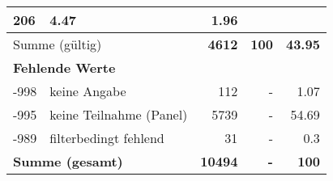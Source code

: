 \begin{longtable}{lXrrr}
       \num{206} &
       \num[round-mode=places,round-precision=2]{4.47} &
         \num[round-mode=places,round-precision=2]{1.96} \\
     \midrule
     \multicolumn{2}{l}{Summe (gültig)} &
       \textbf{\num{4612}} &
     \textbf{\num{100}} &
       \textbf{\num[round-mode=places,round-precision=2]{43.95}} \\
     \multicolumn{5}{l}{\textbf{Fehlende Werte}}\\
       -998 &
       keine Angabe &
         \num{112} &
        - &
         \num[round-mode=places,round-precision=2]{1.07} \\
       -995 &
       keine Teilnahme (Panel) &
         \num{5739} &
        - &
         \num[round-mode=places,round-precision=2]{54.69} \\
       -989 &
       filterbedingt fehlend &
         \num{31} &
        - &
         \num[round-mode=places,round-precision=2]{0.3} \\
     \midrule
     \multicolumn{2}{l}{\textbf{Summe (gesamt)}} &
          \textbf{\num{10494}} &
        \textbf{-} &
        \textbf{\num{100}} \\
     \bottomrule
     \end{longtable}
     
